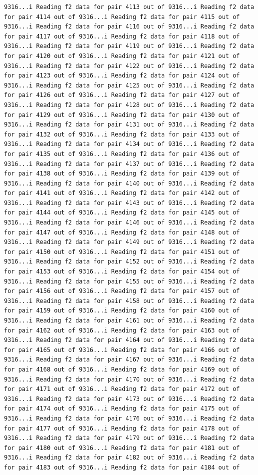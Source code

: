 \documentclass[
]{article}
\begin{document}
\begin{verbatim}
9316...i Reading f2 data for pair 4113 out of 9316...i Reading f2 data for pair 4114 out of 9316...i Reading f2 data for pair 4115 out of 9316...i Reading f2 data for pair 4116 out of 9316...i Reading f2 data for pair 4117 out of 9316...i Reading f2 data for pair 4118 out of 9316...i Reading f2 data for pair 4119 out of 9316...i Reading f2 data for pair 4120 out of 9316...i Reading f2 data for pair 4121 out of 9316...i Reading f2 data for pair 4122 out of 9316...i Reading f2 data for pair 4123 out of 9316...i Reading f2 data for pair 4124 out of 9316...i Reading f2 data for pair 4125 out of 9316...i Reading f2 data for pair 4126 out of 9316...i Reading f2 data for pair 4127 out of 9316...i Reading f2 data for pair 4128 out of 9316...i Reading f2 data for pair 4129 out of 9316...i Reading f2 data for pair 4130 out of 9316...i Reading f2 data for pair 4131 out of 9316...i Reading f2 data for pair 4132 out of 9316...i Reading f2 data for pair 4133 out of 9316...i Reading f2 data for pair 4134 out of 9316...i Reading f2 data for pair 4135 out of 9316...i Reading f2 data for pair 4136 out of 9316...i Reading f2 data for pair 4137 out of 9316...i Reading f2 data for pair 4138 out of 9316...i Reading f2 data for pair 4139 out of 9316...i Reading f2 data for pair 4140 out of 9316...i Reading f2 data for pair 4141 out of 9316...i Reading f2 data for pair 4142 out of 9316...i Reading f2 data for pair 4143 out of 9316...i Reading f2 data for pair 4144 out of 9316...i Reading f2 data for pair 4145 out of 9316...i Reading f2 data for pair 4146 out of 9316...i Reading f2 data for pair 4147 out of 9316...i Reading f2 data for pair 4148 out of 9316...i Reading f2 data for pair 4149 out of 9316...i Reading f2 data for pair 4150 out of 9316...i Reading f2 data for pair 4151 out of 9316...i Reading f2 data for pair 4152 out of 9316...i Reading f2 data for pair 4153 out of 9316...i Reading f2 data for pair 4154 out of 9316...i Reading f2 data for pair 4155 out of 9316...i Reading f2 data for pair 4156 out of 9316...i Reading f2 data for pair 4157 out of 9316...i Reading f2 data for pair 4158 out of 9316...i Reading f2 data for pair 4159 out of 9316...i Reading f2 data for pair 4160 out of 9316...i Reading f2 data for pair 4161 out of 9316...i Reading f2 data for pair 4162 out of 9316...i Reading f2 data for pair 4163 out of 9316...i Reading f2 data for pair 4164 out of 9316...i Reading f2 data for pair 4165 out of 9316...i Reading f2 data for pair 4166 out of 9316...i Reading f2 data for pair 4167 out of 9316...i Reading f2 data for pair 4168 out of 9316...i Reading f2 data for pair 4169 out of 9316...i Reading f2 data for pair 4170 out of 9316...i Reading f2 data for pair 4171 out of 9316...i Reading f2 data for pair 4172 out of 9316...i Reading f2 data for pair 4173 out of 9316...i Reading f2 data for pair 4174 out of 9316...i Reading f2 data for pair 4175 out of 9316...i Reading f2 data for pair 4176 out of 9316...i Reading f2 data for pair 4177 out of 9316...i Reading f2 data for pair 4178 out of 9316...i Reading f2 data for pair 4179 out of 9316...i Reading f2 data for pair 4180 out of 9316...i Reading f2 data for pair 4181 out of 9316...i Reading f2 data for pair 4182 out of 9316...i Reading f2 data for pair 4183 out of 9316...i Reading f2 data for pair 4184 out of 
\end{verbatim}
\end{document}
